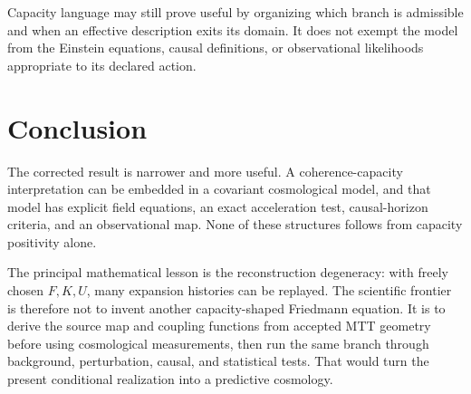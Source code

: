 \documentclass[11pt]{article}
\begin{document}
Capacity language may still prove useful by organizing which branch is
admissible and when an effective description exits its domain.  It does
not exempt the model from the Einstein equations, causal definitions, or
observational likelihoods appropriate to its declared action.

\section{Conclusion}

The corrected result is narrower and more useful.  A coherence-capacity
interpretation can be embedded in a covariant cosmological model, and
that model has explicit field equations, an exact acceleration test,
causal-horizon criteria, and an observational map.  None of these
structures follows from capacity positivity alone.

The principal mathematical lesson is the reconstruction degeneracy:
with freely chosen $F,K,U$, many expansion histories can be replayed.
The scientific frontier is therefore not to invent another
capacity-shaped Friedmann equation.  It is to derive the source map and
coupling functions from accepted MTT geometry before using cosmological
measurements, then run the same branch through background, perturbation,
causal, and statistical tests.  That would turn the present conditional
realization into a predictive cosmology.



\end{document}

